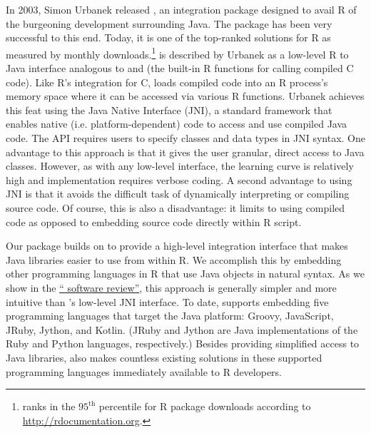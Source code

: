 In 2003, Simon Urbanek released  \citeyearpar{rjava}, an integration package designed to avail R of the burgeoning development surrounding Java. The package has been very successful to this end. Today, it is one of the top-ranked solutions for R as measured by monthly downloads.\footnote{ ranks in the $95^{\text{th}}$ percentile for R package downloads according to \url{http://rdocumentation.org}.}  is described by Urbanek as a low-level R to Java interface analogous to  and  (the built-in R functions for calling compiled C code). Like R's integration for C,  loads compiled code into an R process's memory space where it can be accessed via various R functions. Urbanek achieves this feat using the Java Native Interface (JNI), a standard framework that enables native (i.e. platform-dependent) code to access and use compiled Java code. The  API requires users to specify classes and data types in JNI syntax. One advantage to this approach is that it gives the user granular, direct access to Java classes. However, as with any low-level interface, the learning curve is relatively high and implementation requires verbose coding. A second advantage to using JNI is that it avoids the difficult task of dynamically interpreting or compiling source code. Of course, this is also a disadvantage: it limits  to using compiled code as opposed to embedding source code directly within R script.

Our  package builds on  to provide a high-level integration interface that makes Java libraries easier to use from within R. We accomplish this by embedding other programming languages in R that use Java objects in natural syntax. As we show in the \hyperlink{rjava-software-review}{`` software review''}, this approach is generally simpler and more intuitive than 's low-level JNI interface. To date,  supports embedding five programming languages that target the Java platform: Groovy, JavaScript, JRuby, Jython, and Kotlin. (JRuby and Jython are Java implementations of the Ruby and Python languages, respectively.) Besides providing simplified access to Java libraries,  also makes countless existing solutions in these supported programming languages immediately available to R developers.

